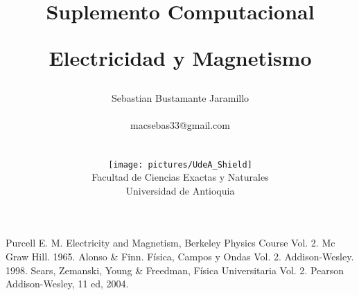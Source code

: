 \documentclass[12pt]{book}
\begin{document}
\title{Suplemento Computacional \\
\begin{Huge}
\textbf{Electricidad y Magnetismo}
\end{Huge}}
\author{ Sebastian Bustamante Jaramillo\\ \begin{small}
macsebas33@gmail.com
\end{small} \\ \vspace{5cm} \\
\texttt{[image: pictures/UdeA\_Shield]} \\
Facultad de Ciencias Exactas y Naturales \\ 
Universidad de Antioquia }
\date{}
\maketitle



\newpage{\pagestyle{empty}\cleardoublepage}  

\tableofcontents
\newpage{\pagestyle{empty}\cleardoublepage}  





















\begin{thebibliography}{}
 Purcell E. M. Electricity and Magnetism, Berkeley 
Physics Course Vol. 2. Mc Graw Hill. 1965. 
 Alonso \& Finn. Física, Campos y Ondas Vol. 2. Addison-Wesley. 
1998.
 Sears, Zemanski, Young \& Freedman, Física Universitaria Vol. 2. 
Pearson Addison-Wesley, 11 ed, 2004.
\end{thebibliography}
\end{document}

